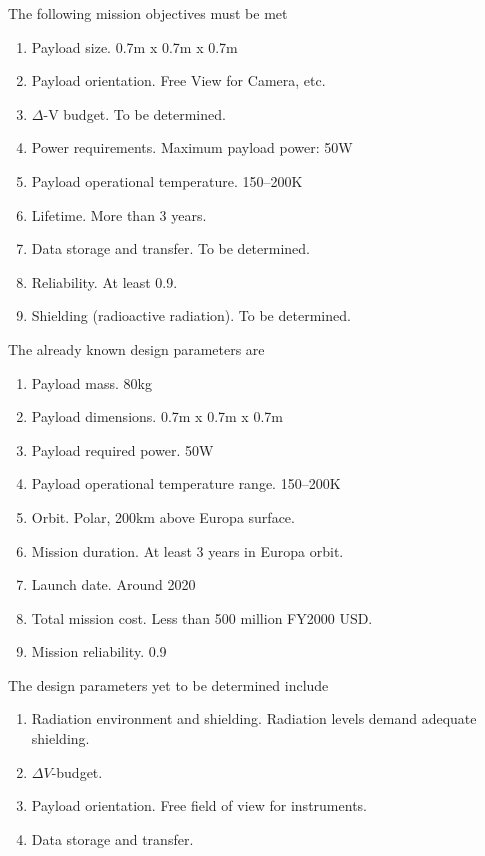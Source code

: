 

The following mission objectives must be met

\begin{enumerate}
\item{Payload size.} 0.7m x 0.7m x 0.7m
\item{Payload orientation.} Free View for Camera, etc.
\item{$\Delta$-V budget.} To be determined.
\item{Power requirements.} Maximum payload power: 50W
\item{Payload operational temperature.} 150--200K
\item{Lifetime.} More than 3 years.
\item{Data storage and transfer.} To be determined.
\item{Reliability.} At least 0.9.
\item{Shielding (radioactive radiation).} To be determined.
\end{enumerate}

The already known design parameters are

\begin{enumerate}
\item{Payload mass.} 80kg
\item{Payload dimensions.} 0.7m x 0.7m x 0.7m
\item{Payload required power.} 50W
\item{Payload operational temperature range.} 150--200K
\item{Orbit.} Polar, 200km above Europa surface.
\item{Mission duration.} At least 3 years in Europa orbit.
\item{Launch date.} Around 2020
\item{Total mission cost.} Less than 500 million FY2000 USD.
\item{Mission reliability.} 0.9
\end{enumerate}

The design parameters yet to be determined include

\begin{enumerate}
\item{Radiation environment and shielding.} Radiation levels demand adequate
  shielding.
\item{$\Delta V$-budget.}
\item{Payload orientation.} Free field of view for instruments.
\item{Data storage and transfer.}
\end{enumerate}

